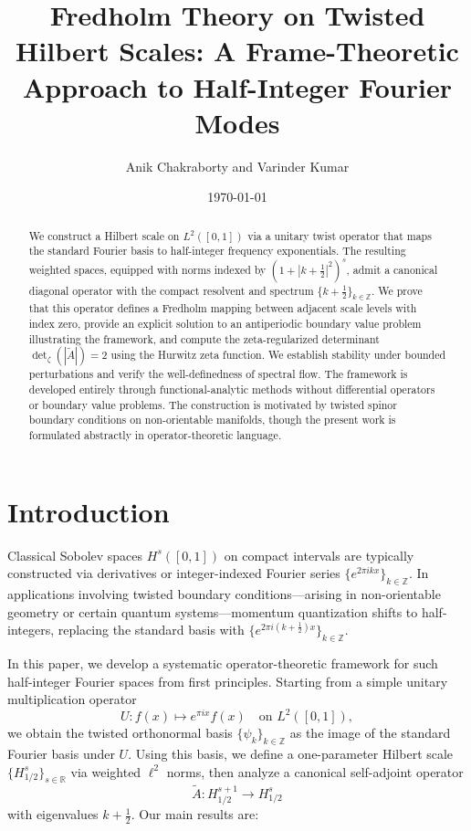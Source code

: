 \documentclass[11pt]{amsart}
\title[Half Integer Fourier Modes]{Fredholm Theory on Twisted Hilbert Scales: A Frame-Theoretic Approach to Half-Integer Fourier Modes}
\author{Anik Chakraborty and Varinder Kumar}
\date{\today}
\theoremstyle{definition}
\theoremstyle{remark}
\begin{document}
\begin{abstract}
We construct a Hilbert scale on $L^2([0,1])$ via a unitary twist operator that maps the standard Fourier basis to half-integer frequency exponentials. The resulting weighted spaces, equipped with norms indexed by $(1+|k+\tfrac{1}{2}|^2)^s$, admit a canonical diagonal operator with the compact resolvent and spectrum $\{k+\tfrac{1}{2}\}_{k\in\mathbb{Z}}$. We prove that this operator defines a Fredholm mapping between adjacent scale levels with index zero, provide an explicit solution to an antiperiodic boundary value problem illustrating the framework, and compute the zeta-regularized determinant $\det_\zeta(|\widetilde{A}|) = 2$ using the Hurwitz zeta function. We establish stability under bounded perturbations and verify the well-definedness of spectral flow. The framework is developed entirely through functional-analytic methods without differential operators or boundary value problems. The construction is motivated by twisted spinor boundary conditions on non-orientable manifolds, though the present work is formulated abstractly in operator-theoretic language.
\end{abstract}

\maketitle

\section{Introduction}

Classical Sobolev spaces $H^s([0,1])$ on compact intervals are typically constructed via derivatives or integer-indexed Fourier series $\{e^{2\pi i k x}\}_{k\in\mathbb{Z}}$. In applications involving twisted boundary conditions---arising in non-orientable geometry or certain quantum systems---momentum quantization shifts to half-integers, replacing the standard basis with $\{e^{2\pi i(k+\frac{1}{2})x}\}_{k\in\mathbb{Z}}$.

In this paper, we develop a systematic operator-theoretic framework for such half-integer Fourier spaces from first principles. Starting from a simple unitary multiplication operator
\[
U: f(x) \mapsto e^{\pi i x} f(x) \quad \text{on } L^2([0,1]),
\]
we obtain the twisted orthonormal basis $\{\psi_k\}_{k\in\mathbb{Z}}$ as the image of the standard Fourier basis under $U$. Using this basis, we define a one-parameter Hilbert scale $\{H^s_{1/2}\}_{s\in\mathbb{R}}$ via weighted $\ell^2$ norms, then analyze a canonical self-adjoint operator
\[
\widetilde{A}: H^{s+1}_{1/2} \to H^s_{1/2}
\]
with eigenvalues $k+\tfrac{1}{2}$. Our main results are:
\end{document}
